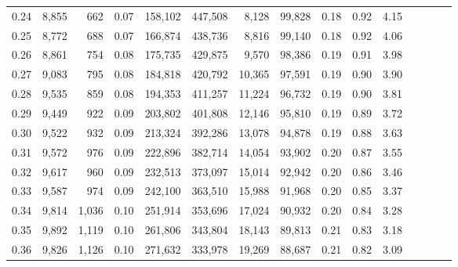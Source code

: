 \begin{tabular}{rrrcrrrrrrrrrrr}
0.24 &   8,855 &    662 &                                       0.07 &  158,102 &  447,508 &    8,128 &   99,828 &  0.18 &  0.92 &                         4.15 \\
0.25 &   8,772 &    688 &                                       0.07 &  166,874 &  438,736 &    8,816 &   99,140 &  0.18 &  0.92 &                         4.06 \\
0.26 &   8,861 &    754 &                                       0.08 &  175,735 &  429,875 &    9,570 &   98,386 &  0.19 &  0.91 &                         3.98 \\
0.27 &   9,083 &    795 &                                       0.08 &  184,818 &  420,792 &   10,365 &   97,591 &  0.19 &  0.90 &                         3.90 \\
0.28 &   9,535 &    859 &                                       0.08 &  194,353 &  411,257 &   11,224 &   96,732 &  0.19 &  0.90 &                         3.81 \\
0.29 &   9,449 &    922 &                                       0.09 &  203,802 &  401,808 &   12,146 &   95,810 &  0.19 &  0.89 &                         3.72 \\
0.30 &   9,522 &    932 &                                       0.09 &  213,324 &  392,286 &   13,078 &   94,878 &  0.19 &  0.88 &                         3.63 \\
0.31 &   9,572 &    976 &                                       0.09 &  222,896 &  382,714 &   14,054 &   93,902 &  0.20 &  0.87 &                         3.55 \\
0.32 &   9,617 &    960 &                                       0.09 &  232,513 &  373,097 &   15,014 &   92,942 &  0.20 &  0.86 &                         3.46 \\
0.33 &   9,587 &    974 &                                       0.09 &  242,100 &  363,510 &   15,988 &   91,968 &  0.20 &  0.85 &                         3.37 \\
0.34 &   9,814 &  1,036 &                                       0.10 &  251,914 &  353,696 &   17,024 &   90,932 &  0.20 &  0.84 &                         3.28 \\
0.35 &   9,892 &  1,119 &                                       0.10 &  261,806 &  343,804 &   18,143 &   89,813 &  0.21 &  0.83 &                         3.18 \\
0.36 &   9,826 &  1,126 &                                       0.10 &  271,632 &  333,978 &   19,269 &   88,687 &  0.21 &  0.82 &                         3.09 \\

\end{tabular}
